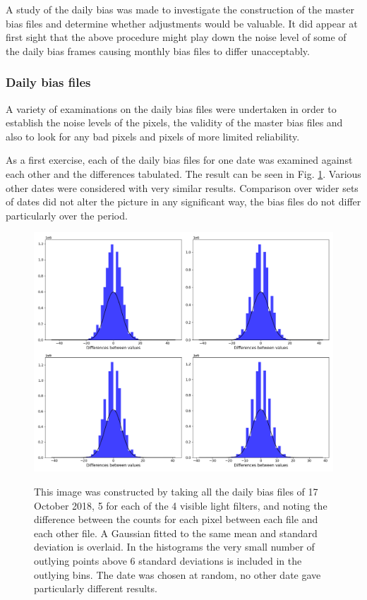 A study of the daily bias was made to investigate the construction of the master
bias files and determine whether adjustments would be valuable. It did appear at
first sight that the above procedure might play down the noise level of some of
the daily bias frames causing monthly bias files to differ unacceptably.

\subsubsection{Daily bias files}
\protect\label{section:dailybiasfiles}

A variety of examinations on the daily bias files were undertaken in order to
establish the noise levels of the pixels, the validity of the master bias files
and also to look for any bad pixels and pixels of more limited reliability.

As a first exercise, each of the daily bias files for one date was examined
against each other and the differences tabulated. The result can be seen in Fig.
\ref{fig:biasdiffs}. Various other dates were considered with very similar
results. Comparison over wider sets of dates did not alter the picture in any
significant way, the bias files do not differ particularly over the period.

\begin{figure}[!htbp]
\begin{center}
\includegraphics[scale=0.4]{images/biasdiffs.png}
\end{center}   
\caption{This image was constructed by taking all the daily bias files of 17
October 2018, 5 for each of the 4 visible light filters, and noting the
difference between the counts for each pixel between each file and each other
file. A Gaussian fitted to the same mean and standard deviation is overlaid.
In the histograms the very small number of outlying points above 6 standard
deviations is included in the outlying bins. The date was chosen at random, no
other date gave particularly different results.} \protect\label{fig:biasdiffs}
\end{figure}

